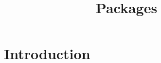 \documentclass{article}
\title{Packages}
\begin{document}
\maketitle

\section{Introduction}
\end{document}
